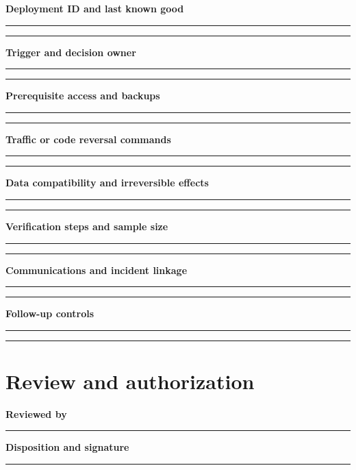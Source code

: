 \documentclass[10pt,letterpaper]{article}
\begin{document}
\textbf{Deployment ID and last known good}\par
\noindent\rule{\linewidth}{0.35pt}\par\vspace{0.7em}
\noindent\rule{\linewidth}{0.35pt}\par\vspace{0.7em}
\textbf{Trigger and decision owner}\par
\noindent\rule{\linewidth}{0.35pt}\par\vspace{0.7em}
\noindent\rule{\linewidth}{0.35pt}\par\vspace{0.7em}
\textbf{Prerequisite access and backups}\par
\noindent\rule{\linewidth}{0.35pt}\par\vspace{0.7em}
\noindent\rule{\linewidth}{0.35pt}\par\vspace{0.7em}
\textbf{Traffic or code reversal commands}\par
\noindent\rule{\linewidth}{0.35pt}\par\vspace{0.7em}
\noindent\rule{\linewidth}{0.35pt}\par\vspace{0.7em}
\textbf{Data compatibility and irreversible effects}\par
\noindent\rule{\linewidth}{0.35pt}\par\vspace{0.7em}
\noindent\rule{\linewidth}{0.35pt}\par\vspace{0.7em}
\textbf{Verification steps and sample size}\par
\noindent\rule{\linewidth}{0.35pt}\par\vspace{0.7em}
\noindent\rule{\linewidth}{0.35pt}\par\vspace{0.7em}
\textbf{Communications and incident linkage}\par
\noindent\rule{\linewidth}{0.35pt}\par\vspace{0.7em}
\noindent\rule{\linewidth}{0.35pt}\par\vspace{0.7em}
\textbf{Follow-up controls}\par
\noindent\rule{\linewidth}{0.35pt}\par\vspace{0.7em}
\noindent\rule{\linewidth}{0.35pt}\par\vspace{0.7em}
\section{Review and authorization}
\textbf{Reviewed by}\par
\noindent\rule{\linewidth}{0.35pt}\par\vspace{0.7em}
\textbf{Disposition and signature}\par
\noindent\rule{\linewidth}{0.35pt}\par\vspace{0.7em}
\end{document}
